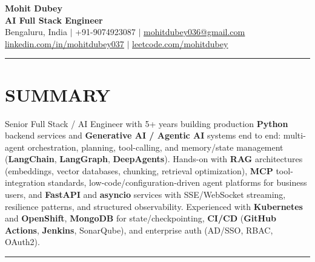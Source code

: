 \documentclass[a4paper]{article}
\newcommand{\sectionline}{
\begin{center}
\vspace{-9pt}
\rule{1\textwidth}{0.5pt}
\end{center}
\vspace{1pt}
}
\begin{document}
\begin{center}
    \textbf{\Huge Mohit Dubey} \\ \vspace{4pt}
    \textbf{AI Full Stack Engineer } \\ \vspace{6pt}
    \small Bengaluru, India $|$ +91-9074923087 $|$ \href{mailto:mohitdubey036@gmail.com}{\underline{mohitdubey036@gmail.com}} \\
    \href{https://www.linkedin.com/in/mohit-dubey-037/}{\underline{linkedin.com/in/mohitdubey037}} $|$ \href{https://leetcode.com/u/mohitdubey037/}
    {\underline{leetcode.com/mohitdubey}}
\end{center}


\sectionline
\section*{SUMMARY}
Senior Full Stack / AI Engineer with 5+ years building production \textbf{Python} backend services and \textbf{Generative AI / Agentic AI} systems end to end: multi-agent orchestration, planning, tool-calling, and memory/state management (\textbf{LangChain}, \textbf{LangGraph}, \textbf{DeepAgents}). Hands-on with \textbf{RAG} architectures (embeddings, vector databases, chunking, retrieval optimization), \textbf{MCP} tool-integration standards, low-code/configuration-driven agent platforms for business users, and \textbf{FastAPI} and \textbf{asyncio} services with SSE/WebSocket streaming, resilience patterns, and structured observability. Experienced with \textbf{Kubernetes} and \textbf{OpenShift}, \textbf{MongoDB} for state/checkpointing, \textbf{CI/CD} (\textbf{GitHub Actions}, \textbf{Jenkins}, SonarQube), and enterprise auth (AD/SSO, RBAC, OAuth2).

\sectionline
\end{document}
